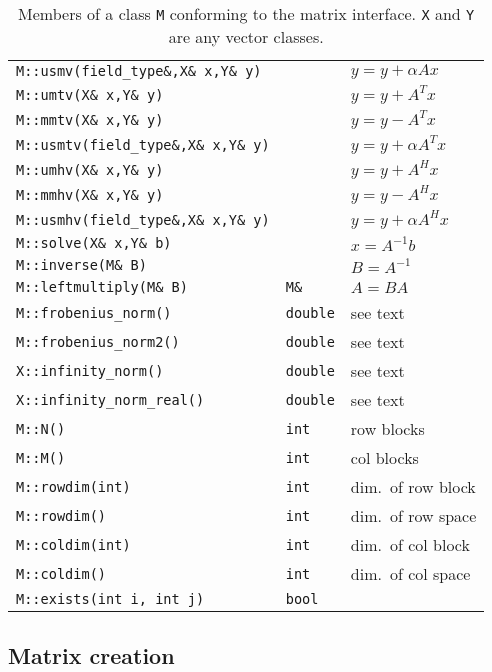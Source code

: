 \documentclass[11pt]{article}
\begin{document}
\begin{table}[htb]
\begin{center}
\begin{tabular}{|l|l|l|}
\texttt{M::usmv(field\_type\&,X\& x,Y\& y)}   &  & $y = y + \alpha Ax$\\
\texttt{M::umtv(X\& x,Y\& y)}   &  & $y = y + A^Tx$\\
\texttt{M::mmtv(X\& x,Y\& y)}   &  & $y = y - A^Tx$\\
\texttt{M::usmtv(field\_type\&,X\& x,Y\& y)}  &  & $y = y + \alpha A^Tx$\\
\texttt{M::umhv(X\& x,Y\& y)}   &  & $y = y + A^Hx$\\
\texttt{M::mmhv(X\& x,Y\& y)}   &  & $y = y - A^Hx$\\
\texttt{M::usmhv(field\_type\&,X\& x,Y\& y)}  &  & $y = y + \alpha A^Hx$\\
\hline
\texttt{M::solve(X\& x,Y\& b)}   &  & $x = A^{-1}b$\\
\texttt{M::inverse(M\& B)} & & $B=A^{-1}$\\
\texttt{M::leftmultiply(M\& B)} & \texttt{M\&} & $A = BA$\\
\hline
\texttt{M::frobenius\_norm()} & \texttt{double} & see text\\
\texttt{M::frobenius\_norm2()} & \texttt{double} &see text\\
\texttt{X::infinity\_norm()} & \texttt{double} & see text\\
\texttt{X::infinity\_norm\_real()} & \texttt{double} &see text\\
\hline
\texttt{M::N()} & \texttt{int} & row blocks\\
\texttt{M::M()} & \texttt{int} & col blocks\\
\texttt{M::rowdim(int)} & \texttt{int} & dim.~of row block\\
\texttt{M::rowdim()} & \texttt{int} & dim.~of row space\\
\texttt{M::coldim(int)} & \texttt{int} & dim.~of col block\\
\texttt{M::coldim()} & \texttt{int} & dim.~of col space\\
\texttt{M::exists(int i, int j)} & \texttt{bool} &\\
\hline
\end{tabular}
\end{center}

\caption{Members of a class \lstinline!M! conforming to the matrix
  interface. \lstinline!X! and \lstinline!Y! are any vector classes.}
\label{Tab:MatrixMembers}
\end{table}

\subsection{Matrix creation}
\end{document}
